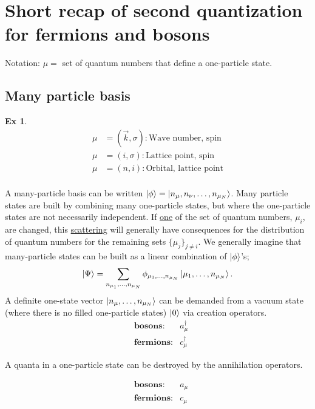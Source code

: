 \section{Short recap of second quantization for fermions and bosons}

Notation: $ \mu = $ set of quantum numbers that define a one-particle state.


\subsection{Many particle basis}
\newtheorem{theorem}{Ex}
\begin{theorem}


\begin{align*}
\mu &= (\vec{k}, \sigma):\text{Wave number, spin} \\
\mu &= (i, \sigma) : \text{Lattice point, spin} \\
\mu &= (n, i) : \text{Orbital, lattice point} \\
\end{align*}

\end{theorem}

A many-particle basis can be written $\ket{\phi} = \ket{n_{\mu}, n_{\nu}, \dots, n_{\mu_N}}$. Many particle states are built by combining many one-particle states, but where the one-particle states are not necessarily independent. If  \underline{one} of the set of quantum numbers, $\mu_i$, are changed, this \underline{scattering} will generally have consequences for the distribution of quantum numbers for the remaining sets $\{\mu_j\}_{j\ne i}$.
We generally imagine that many-particle states can be built as a linear combination of
$\ket{\phi}$'s;
\begin{equation}
\ket{\Psi} = \sum_{n_{\mu_1},\dots, n_{\mu_N}}\phi_{{\mu_1},\dots, n_{\mu_N}}\ket{{\mu_1},\dots, n_{\mu_N}}.
\end{equation}
A definite one-state vector $\ket{n_{\mu},\dots, n_{\mu_N}}$ can be demanded from a vacuum state (where there is no filled one-particle states) $\ket{0}$ via creation operators.
\begin{align*}
&\textbf{bosons}: &a_\mu^\dagger \\ 
&\textbf{fermions}: &c_\mu^\dagger
\end{align*}


A quanta in a one-particle state can be destroyed by the annihilation operators.

\begin{align*}
&\textbf{bosons}: &a_\mu \\ 
&\textbf{fermions}: &c_\mu
\end{align*}


